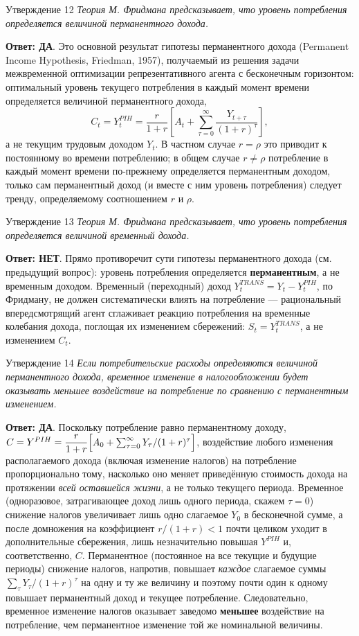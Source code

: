 \documentclass[10pt,a4paper]{article}
\newcommand{\qda}{\textbf{\color{yesgreen}Ответ: ДА}}
\newcommand{\qnet}{\textbf{\color{nored}Ответ: НЕТ}}
\newenvironment{answer}[2]{%
  \begin{qbox}{Утверждение #1}
  \textit{#2}\par\smallskip
}{%
  \end{qbox}\vspace{2pt}
}
\begin{document}
\begin{answer}{12}{Теория М. Фридмана предсказывает, что уровень потребления определяется величиной перманентного дохода.}
\qda. Это основной результат гипотезы перманентного дохода (Permanent Income Hypothesis, Friedman, 1957), получаемый из решения задачи межвременной оптимизации репрезентативного агента с бесконечным горизонтом: оптимальный уровень текущего потребления в каждый момент времени определяется величиной перманентного дохода,
\[
C_t = Y_t^{PIH} = \frac{r}{1+r}\left[A_t+\sum_{\tau=0}^{\infty}\frac{Y_{t+\tau}}{(1+r)^{\tau}}\right],
\]
а не текущим трудовым доходом $Y_t$. В частном случае $r=\rho$ это приводит к постоянному во времени потреблению; в общем случае $r\ne\rho$ потребление в каждый момент времени по-прежнему определяется перманентным доходом, только сам перманентный доход (и вместе с ним уровень потребления) следует тренду, определяемому соотношением $r$ и $\rho$.
\end{answer}
 
\begin{answer}{13}{Теория М. Фридмана предсказывает, что уровень потребления определяется величиной временный дохода.}
\qnet. Прямо противоречит сути гипотезы перманентного дохода (см. предыдущий вопрос): уровень потребления определяется \textbf{перманентным}, а не временным доходом. Временный (переходный) доход $Y^{TRANS}_t=Y_t-Y_t^{PIH}$, по Фридману, не должен систематически влиять на потребление — рациональный впередсмотрящий агент сглаживает реакцию потребления на временные колебания дохода, поглощая их изменением сбережений: $S_t=Y^{TRANS}_t$, а не изменением $C_t$.
\end{answer}
 
\begin{answer}{14}{Если потребительские расходы определяются величиной перманентного дохода, временное изменение в налогообложении будет оказывать меньшее воздействие на потребление по сравнению с перманентным изменением.}
\qda. Поскольку потребление равно перманентному доходу, $C=Y^{PIH}=\dfrac{r}{1+r}\Bigl[A_0+\sum_{\tau=0}^{\infty}Y_\tau/(1+r)^\tau\Bigr]$, воздействие любого изменения располагаемого дохода (включая изменение налогов) на потребление пропорционально тому, насколько оно меняет приведённую стоимость дохода на протяжении \emph{всей оставшейся жизни}, а не только текущего периода. Временное (одноразовое, затрагивающее доход лишь одного периода, скажем $\tau=0$) снижение налогов увеличивает лишь одно слагаемое $Y_0$ в бесконечной сумме, а после домножения на коэффициент $r/(1+r)<1$ почти целиком уходит в дополнительные сбережения, лишь незначительно повышая $Y^{PIH}$ и, соответственно, $C$. Перманентное (постоянное на все текущие и будущие периоды) снижение налогов, напротив, повышает \emph{каждое} слагаемое суммы $\sum_\tau Y_\tau/(1+r)^\tau$ на одну и ту же величину и поэтому почти один к одному повышает перманентный доход и текущее потребление. Следовательно, временное изменение налогов оказывает заведомо \textbf{меньшее} воздействие на потребление, чем перманентное изменение той же номинальной величины.
\end{answer}
 
\end{document}
